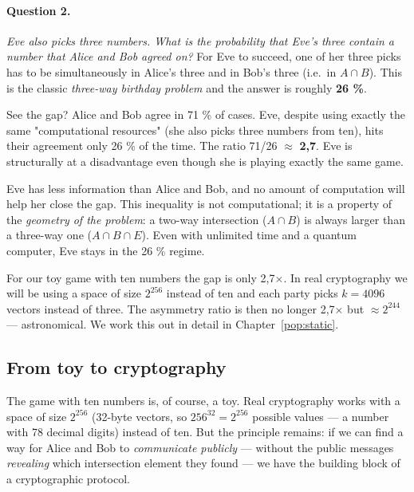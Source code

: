 \documentclass[11pt,a4paper]{article}
\begin{document}
\paragraph{Question 2.} \emph{Eve also picks three numbers. What is the probability that Eve's three contain a number that Alice and Bob agreed on?} For Eve to succeed, one of her three picks has to be simultaneously in Alice's three and in Bob's three (i.e.\ in $A \cap B$). This is the classic \emph{three-way birthday problem} and the answer is roughly \textbf{26 \%}.

See the gap? Alice and Bob agree in 71 \% of cases. Eve, despite using exactly the same "computational resources" (she also picks three numbers from ten), hits their agreement only 26 \% of the time. The ratio 71/26 $\approx$ \textbf{2{,}7}. Eve is structurally at a disadvantage even though she is playing exactly the same game.

\begin{aha}
Eve has less information than Alice and Bob, and no amount of computation will help her close the gap. This inequality is not computational; it is a property of the \emph{geometry of the problem}: a two-way intersection ($A \cap B$) is always larger than a three-way one ($A \cap B \cap E$). Even with unlimited time and a quantum computer, Eve stays in the 26 \% regime.
\end{aha}

For our toy game with ten numbers the gap is only 2{,}7$\times$. In real cryptography we will be using a space of size $2^{256}$ instead of ten and each party picks $k = 4096$ vectors instead of three. The asymmetry ratio is then no longer 2{,}7$\times$ but $\approx 2^{244}$ --- astronomical. We work this out in detail in Chapter~\ref{pop:static}.

\subsection{From toy to cryptography}

The game with ten numbers is, of course, a toy. Real cryptography works with a space of size $2^{256}$ (32-byte vectors, so $256^{32} = 2^{256}$ possible values --- a number with 78 decimal digits) instead of ten. But the principle remains: if we can find a way for Alice and Bob to \emph{communicate publicly} --- without the public messages \emph{revealing} which intersection element they found --- we have the building block of a cryptographic protocol.
\end{document}
